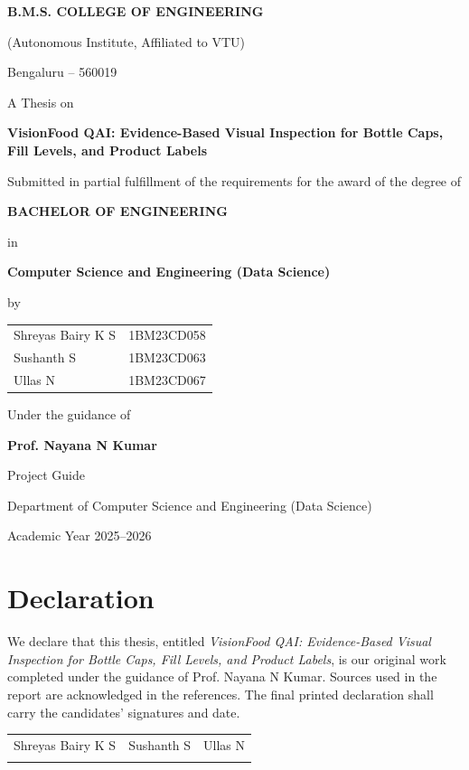 \documentclass[12pt,a4paper]{report}
\begin{document}
\begin{titlepage}\centering
\vspace*{0.3in}
{\Large\bfseries B.M.S. COLLEGE OF ENGINEERING\par}
{\large (Autonomous Institute, Affiliated to VTU)\par}
{\large Bengaluru -- 560019\par}
\vspace{0.7in}
{\Large A Thesis on\par}
\vspace{0.15in}
{\LARGE\bfseries VisionFood QAI: Evidence-Based Visual Inspection for Bottle Caps, Fill Levels, and Product Labels\par}
\vspace{0.5in}
{\large Submitted in partial fulfillment of the requirements for the award of the degree of\par}
\vspace{0.2in}
{\Large\bfseries BACHELOR OF ENGINEERING\par}
{\large in\par}
{\Large\bfseries Computer Science and Engineering (Data Science)\par}
\vspace{0.55in}
{\large by\par}
\vspace{0.1in}
\begin{tabular}{ll}
Shreyas Bairy K S & 1BM23CD058\\
Sushanth S & 1BM23CD063\\
Ullas N & 1BM23CD067
\end{tabular}\par
\vspace{0.55in}
{\large Under the guidance of\par}
{\large\bfseries Prof. Nayana N Kumar\par}
{\large Project Guide\par}
\vfill
{\large Department of Computer Science and Engineering (Data Science)\par}
{\large Academic Year 2025--2026\par}
\end{titlepage}

\chapter*{Declaration}
We declare that this thesis, entitled \emph{VisionFood QAI: Evidence-Based Visual Inspection for Bottle Caps, Fill Levels, and Product Labels}, is our original work completed under the guidance of Prof. Nayana N Kumar. Sources used in the report are acknowledged in the references. The final printed declaration shall carry the candidates' signatures and date.\\[1in]
\begin{tabular}{lll}Shreyas Bairy K S & Sushanth S & Ullas N\\[0.35in]\hrulefill & \hrulefill & \hrulefill\end{tabular}
\end{document}
